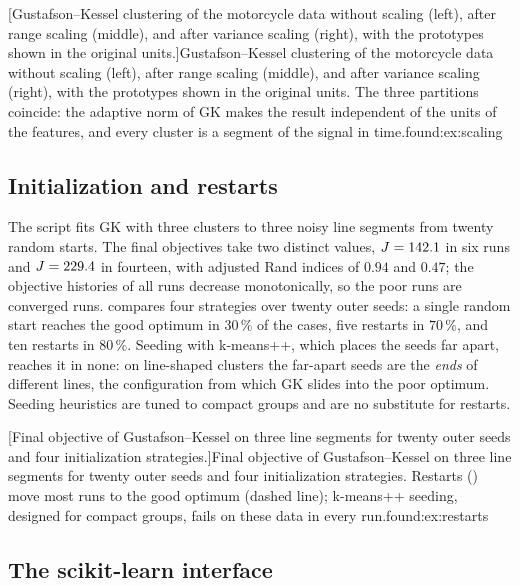 [Gustafson--Kessel clustering of the motorcycle data without scaling (left), after range scaling (middle), and after variance scaling (right), with the prototypes shown in the original units.]{Gustafson--Kessel clustering of the motorcycle data without scaling (left), after range scaling (middle), and after variance scaling (right), with the prototypes shown in the original units. The three partitions coincide: the adaptive norm of GK makes the result independent of the units of the features, and every cluster is a segment of the signal in time.}{found:ex:scaling}

\subsection{Initialization and restarts}\label{sec:found:ex:init}

The script  fits GK with three clusters to three noisy line segments from twenty random starts. The final objectives take two distinct values, $J=142.1$ in six runs and $J=229.4$ in fourteen, with adjusted Rand indices of $0.94$ and $0.47$; the objective histories of all runs decrease monotonically, so the poor runs are converged runs.  compares four strategies over twenty outer seeds: a single random start reaches the good optimum in $30\,\%$ of the cases, five restarts in $70\,\%$, and ten restarts in $80\,\%$. Seeding with k-means++, which places the seeds far apart, reaches it in none: on line-shaped clusters the far-apart seeds are the \emph{ends} of different lines, the configuration from which GK slides into the poor optimum. Seeding heuristics are tuned to compact groups and are no substitute for restarts.

[Final objective of Gustafson--Kessel on three line segments for twenty outer seeds and four initialization strategies.]{Final objective of Gustafson--Kessel on three line segments for twenty outer seeds and four initialization strategies. Restarts () move most runs to the good optimum (dashed line); k-means++ seeding, designed for compact groups, fails on these data in every run.}{found:ex:restarts}

\subsection{The scikit-learn interface}\label{sec:found:ex:sklearn}

